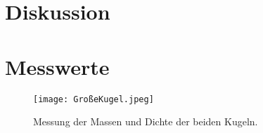 \section{Diskussion}
\label{sec:Diskussion}

\section{Messwerte}
\label{sec:Messwerte}

\begin{figure}
    \centering
    \texttt{[image: GroßeKugel.jpeg]}
    \caption{Messung der Massen und Dichte der beiden Kugeln.}
    \label{fig:MasseDichte}
  \end{figure}
